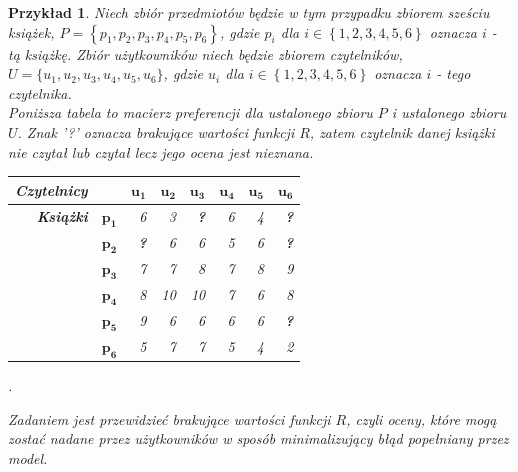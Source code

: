 \documentclass[12pt,a4paper]{report}
\newtheorem{przyklad}{Przykład}[chapter]{\normalfont}
\newcommand{\set}[1]{\left\lbrace {#1} \right\rbrace}
\newcommand{\setUzytkownicy}{\mathit{U}}
\newcommand{\setPrzedmioty}{\mathit{P}}
\begin{document}
\begin{przyklad}
Niech zbiór przedmiotów będzie w tym przypadku zbiorem sześciu książek, $\setPrzedmioty = \set{p_1, p_2, p_3, p_4, p_5, p_6}$, gdzie $p_i$ dla $i \in \set{1,2,3,4,5,6}$ oznacza $i$ - tą książkę. Zbiór użytkowników niech będzie zbiorem czytelników, $\setUzytkownicy = \{u_1, u_2, u_3, u_4, u_5, u_6\}$, gdzie $u_i$ dla $i \in \set{1,2,3,4,5,6}$ oznacza $i$ - tego czytelnika.
\\Poniższa tabela to macierz preferencji dla ustalonego zbioru $\setPrzedmioty$ i ustalonego zbioru $\setUzytkownicy$. Znak '?' oznacza brakujące wartości funkcji $R$, zatem czytelnik danej książki nie czytał lub czytał lecz jego ocena jest nieznana.
\begin{center}
\begin{tabular}{|r|r|r|r|r|r|r|r|} \hline
\textbf{Czytelnicy} & & $\mathbf{u_1}$ & $\mathbf{u_2}$ & $\mathbf{u_3}$ & $\mathbf{u_4}$ & $\mathbf{u_5}$ & $\mathbf{u_6}$ \\
\hline
\hline
\textbf{Książki} &$\mathbf{p_1}$ & 6 & 3 & \textbf{?} & 6 & 4 & \textbf{?} \\
\hline
&$\mathbf{p_2}$ & \textbf{?} & 6 & 6 & 5 & 6 & \textbf{?} \\
\hline
&$\mathbf{p_3}$ & 7 & 7 & 8 & 7 & 8 & 9  \\
\hline
&$\mathbf{p_4}$ & 8 & 10 & 10 & 7 & 6 & 8 \\
\hline
&$\mathbf{p_5}$ & 9 & 6 & 6 & 6 & 6 & \textbf{?} \\
\hline
&$\mathbf{p_6}$ & 5 & 7 & 7 & 5 & 4 & 2 \\
\hline
\end{tabular}.
\end{center}

Zadaniem jest przewidzieć brakujące wartości funkcji $R$, czyli oceny, które mogą zostać nadane przez użytkowników w sposób minimalizujący błąd popełniany przez model.
\end{przyklad}
\end{document}

